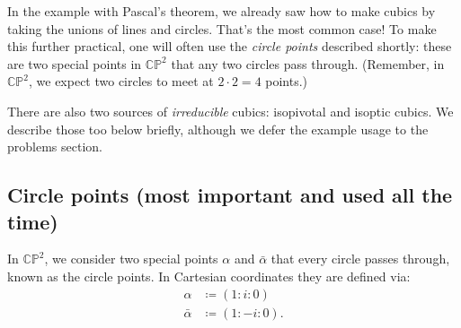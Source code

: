 \documentclass[11pt]{scrartcl}
\begin{document}
In the example with Pascal's theorem,
we already saw how to make cubics by taking the unions of lines and circles.
That's the most common case!
To make this further practical, one will often use the \emph{circle points}
described shortly: these are two special points in $\mathbb{CP}^2$ that any two circles pass through.
(Remember, in $\mathbb{CP}^2$, we expect two circles to meet at $2 \cdot 2 = 4$ points.)

There are also two sources of \emph{irreducible} cubics: isopivotal and isoptic cubics.
We describe those too below briefly,
although we defer the example usage to the problems section.

\subsection{Circle points (most important and used all the time)}
In $\mathbb{CP}^2$, we consider two special points $\alpha$ and $\bar\alpha$
that every circle passes through, known as the \alert{circle points}.
In Cartesian coordinates they are defined via:
\begin{align*}
  \alpha &\coloneq (1:i:0) \\
  \bar{\alpha} &\coloneq (1:-i:0).
\end{align*}
\end{document}
